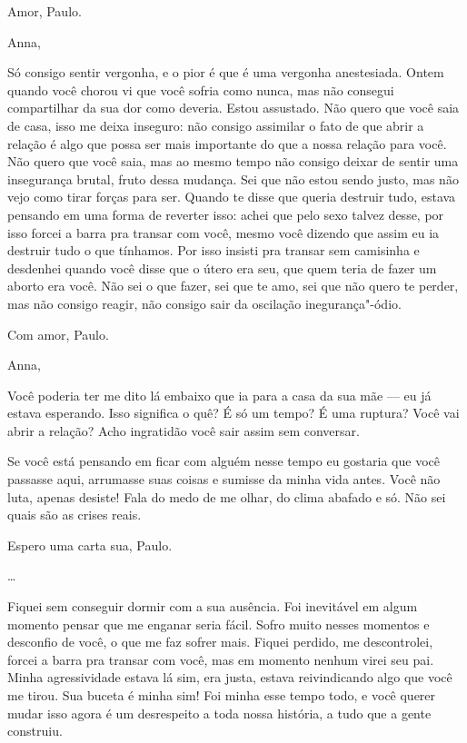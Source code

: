 \medskip{}  \begin{flushright}Amor, Paulo.\end{flushright}


\asterisc{}

\pagebreak{}

Anna,

\medskip{} 

Só consigo sentir vergonha, e o pior é que é uma vergonha anestesiada.
Ontem quando você chorou vi que você sofria como nunca, mas não consegui
compartilhar da sua dor como deveria. Estou assustado. Não quero que
você saia de casa, isso me deixa inseguro: não consigo assimilar o fato
de que abrir a relação é algo que possa ser mais importante do que a
nossa relação para você. Não quero que você saia, mas ao mesmo tempo não
consigo deixar de sentir uma insegurança brutal, fruto dessa mudança.
Sei que não estou sendo justo, mas não vejo como tirar forças para ser.
Quando te disse que queria destruir tudo, estava pensando em uma forma
de reverter isso: achei que pelo sexo talvez desse, por isso forcei a
barra pra transar com você, mesmo você dizendo que assim eu ia destruir
tudo o que tínhamos. Por isso insisti pra transar sem camisinha e
desdenhei quando você disse que o útero era seu, que quem teria de fazer
um aborto era você. Não sei o que fazer, sei que te amo, sei que não
quero te perder, mas não consigo reagir, não consigo sair da oscilação
inegurança"-ódio.

\medskip{}  \begin{flushright}Com amor, Paulo.\end{flushright}


\asterisc{}

Anna,

\medskip{} 

Você poderia ter me dito lá embaixo que ia para a casa da sua mãe --- eu
já estava esperando. Isso significa o quê? É só um tempo? É uma ruptura?
Você vai abrir a relação? Acho ingratidão você sair assim sem conversar.

Se você está pensando em ficar com alguém nesse tempo eu gostaria que
você passasse aqui, arrumasse suas coisas e sumisse da minha vida antes.
Você não luta, apenas desiste! Fala do medo de me olhar, do clima
abafado e só. Não sei quais são as crises reais.

Espero uma carta sua, Paulo.

…

Fiquei sem conseguir dormir com a sua ausência. Foi inevitável em algum
momento pensar que me enganar seria fácil. Sofro muito nesses momentos e
desconfio de você, o que me faz sofrer mais. Fiquei perdido, me
descontrolei, forcei a barra pra transar com você, mas em momento nenhum
virei seu pai. Minha agressividade estava lá sim, era justa, estava
reivindicando algo que você me tirou. Sua buceta é minha sim! Foi minha
esse tempo todo, e você querer mudar isso agora é um desrespeito a toda
nossa história, a tudo que a gente construiu.

